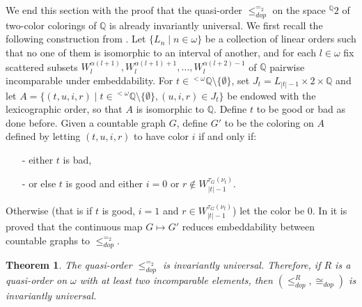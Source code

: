 \documentclass{amsart}
\newtheorem{theorem}{Theorem}[section]
\theoremstyle{definition}
\theoremstyle{remark}
\begin{document}
We end this section with the proof that the quasi-order
$\leq_{dop}^{=_2}$ on the space ${}^{\mathbb{Q}} 2$ of two-color
colorings of ${\mathbb{Q}}$ is already invariantly universal. We first recall
the following construction from
\cite[Theorem 8]{Camerlo}. Let $\{ L_n \mid n \in \omega \}$ be a
collection of linear orders such that no one of them is
isomorphic to an interval of another, and for each $l \in \omega$ fix
scattered subsets
$W_l^{\alpha(l+1)}, W_l^{\alpha(l+1)+1}, \dotsc, W_l^{\alpha(l+2)-1}$
of ${\mathbb{Q}}$ pairwise incomparable under embeddability.
For $t\in {}^{<\omega } {\mathbb{Q}} \setminus\{\emptyset\} $, set
$J_t=L_{|t|-1}\times 2\times {\mathbb{Q}} $ and let
$A= \{ (t,u,i,r) \mid t \in {}^{< \omega} {\mathbb{Q}} \setminus \{ \emptyset
\}, (u,i,r) \in J_t\}$ be endowed with the lexicographic order, so
that $A$ is isomorphic to
${\mathbb{Q}}$. Define $t$ to be good or bad as done before. Given a countable
graph $G$, define $G'$ to be the coloring on $A$ defined by letting
$(t,u,i,r)$ to have color $i$ if and only if:
\begin{itemize}
\item[-] either $t$ is bad,
\item[-] or else $t$ is good and either $i = 0$ or $r \notin
  W_{|t|-1}^{\tau_G(\nu_t)}$.
\end{itemize}
Otherwise (that is if $t$ is good, $i=1$ and $r\in W_{|t|-1}^{\tau_G(\nu_t)}$) let
the color be $0$.
In \cite[Theorem 8]{Camerlo}  it is proved that the continuous map $G
\mapsto G'$ reduces embeddability between countable graphs to
$\leq^{=_2}_{dop}$.

\begin{theorem}\label{theoreq2}
The quasi-order $\leq_{dop}^{=_2}$ is invariantly
universal. Therefore, if $R$ is a quasi-order on $\omega$ with at
least two incomparable elements, then $(\leq^R_{dop},\cong_{dop})$ is
invariantly universal.
\end{theorem}
\end{document}

